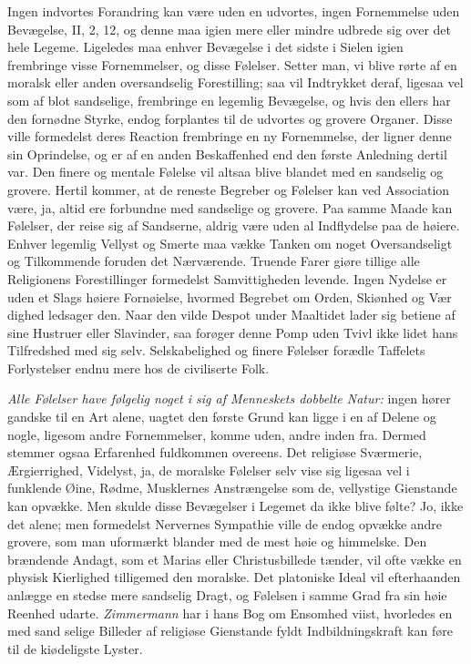 \documentclass[12pt,a4paper]{article}
\newcommand{\opage}[1]{\marginnote{\footnotesize\textit{[#1]}}}
\begin{document}
Ingen indvortes Forandring kan være uden en udvortes, ingen Fornemmelse uden Bevægelse,
II, 2, 12, og denne maa igien mere eller mindre udbrede sig over det hele Legeme.
Ligeledes maa enhver Bevægelse i det sidste i Sielen igien frembringe visse Fornemmelser,
og disse Følelser. Setter man, vi blive rørte af en moralsk eller anden oversandselig
Forestilling; saa vil Indtrykket deraf, ligesaa vel som af blot sandselige, frembringe en
legemlig Bevægelse, og hvis den ellers har den fornødne Styrke, endog forplantes til de
udvortes og grovere Organer. Disse ville formedelst deres Reaction frembringe en ny
Fornemmelse, der ligner denne sin Oprindelse, og er af en anden Beskaffenhed end den første
Anledning dertil var. Den finere og mentale Følelse vil altsaa blive blandet med en
sandselig og grovere. Hertil kommer, at de reneste Begreber og Følelser kan ved Association
være, ja, altid ere forbundne med sandselige og grovere. Paa samme Maade kan Følelser, der
reise sig af Sandserne, aldrig være uden al Indflydelse paa de høiere. Enhver legemlig
Vellyst og Smerte maa vække Tanken om noget Oversandseligt og Tilkommende foruden det
Nærværende. Truende Farer giøre tillige alle Religionens Forestillinger formedelst
Samvittigheden levende. Ingen Nydelse er uden et Slags høiere Fornøielse, hvormed Begrebet
om Orden, Skiønhed og Vær%
\opage{217}dighed ledsager den. Naar den vilde Despot under Maaltidet lader sig betiene af sine
Hustruer eller Slavinder, saa forøger denne Pomp uden Tvivl ikke lidet hans Tilfredshed med
sig selv. Selskabelighed og finere Følelser forædle Taffelets Forlystelser endnu mere hos
de civiliserte Folk.

\emph{Alle Følelser have følgelig noget i sig af Menneskets dobbelte Natur:} ingen hører
gandske til en Art alene, uagtet den første Grund kan ligge i en af Delene og nogle,
ligesom andre Fornemmelser, komme uden, andre inden fra. Dermed stemmer ogsaa Erfarenhed
fuldkommen overeens. Det religiøse Sværmerie, Ærgierrighed, Videlyst, ja, de moralske
Følelser selv vise sig ligesaa vel i funklende Øine, Rødme, Musklernes Anstrængelse som de,
vellystige Gienstande kan opvække. Men skulde disse Bevægelser i Legemet da ikke blive
følte? Jo, ikke det alene; men formedelst Nervernes Sympathie ville de endog opvække andre
grovere, som man uformærkt blander med de mest høie og himmelske. Den brændende Andagt, som
et Marias eller Christusbillede tænder, vil ofte vække en physisk Kierlighed tilligemed den
moralske. Det platoniske Ideal vil efterhaanden anlægge en stedse mere sandselig Dragt, og
Følelsen i samme Grad fra sin høie Reenhed udarte. \emph{Zimmermann} har i hans Bog om
Ensomhed viist, hvorledes en med sand%
\opage{218}selige Billeder af religiøse Gienstande fyldt Indbildningskraft kan føre til de kiødeligste
Lyster.
\end{document}
